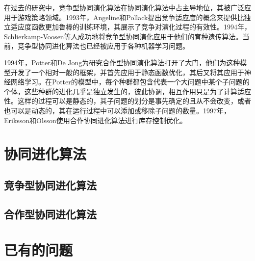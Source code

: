 \documentclass[a4paper]{article}
\begin{document}
    在过去的研究中，竞争型协同演化算法在协同演化算法中占主导地位，其被广泛应用于游戏策略领域\cite{rosin1995methods,pollack1998co}。1993年，Angeline和Pollack提出竞争适应度的概念来提供比独立适应度函数更加鲁棒的训练环境，其展示了竞争对演化过程的有效性。1994年，Schlierkamp-Voosen等人成功地将竞争型协同演化应用于他们的育种遗传算法。当前，竞争型协同进化算法也已经被应用于各种机器学习问题。
    
    1994年，Potter和De Jong为研究合作型协同演化算法打开了大门\cite{potter1994cooperative}，他们为这种模型开发了一个相对一般的框架，并首先应用于静态函数优化，其后又将其应用于神经网络学习。在Potter的模型中，每个种群都包含代表一个大问题中某个子问题的个体，这些种群的进化几乎是独立发生的，彼此协调，相互作用只是为了计算适应性。这样的过程可以是静态的，其子问题的划分是事先确定的且从不会改变，或者也可以是动态的，其在运行过程中可以添加或移除子问题的数量。1997年，Eriksson和Olsson使用合作协同进化算法进行库存控制优化。

    \newpage
    \section{协同进化算法}

    \subsection{竞争型协同进化算法}

    \subsection{合作型协同进化算法}

    \newpage
    \section{已有的问题}

    \newpage
    
    
\end{document}
